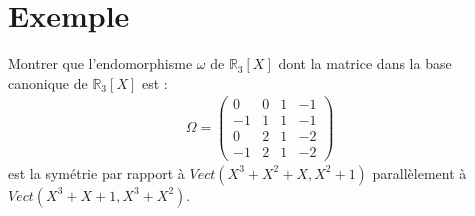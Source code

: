\documentclass[../main.tex]{subfiles}
\begin{document}
\section{Exemple}
\begin{tcolorbox}[title=Exemple 28.22, title filled=false, colframe=darkgreen, colback=darkgreen!10!white]
    Montrer que l'endomorphisme $\omega$ de $\mathbb{R}_3[X]$ dont la matrice dans la base canonique de $\mathbb{R}_3[X]$ est :
    \begin{align*}
        \Omega = \begin{pmatrix}
            0 & 0 & 1 & -1 \\
            -1 & 1 & 1 & -1 \\
            0 & 2 & 1 & -2 \\
            -1 & 2 & 1 & -2
        \end{pmatrix}
    \end{align*}
    est la symétrie par rapport à $Vect(X^3 + X^2 + X, X^2 + 1)$ parallèlement à $Vect(X^3 + X + 1, X^3 + X^2)$. 
\end{tcolorbox}
\end{document}
